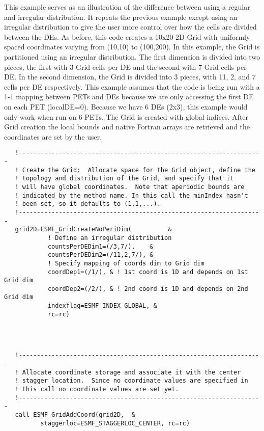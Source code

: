    This example serves as an illustration of the difference between using
   a regular and irregular distribution. It repeats the previous example
   except using an irregular distribution to give the user more control
   over how the cells are divided between the DEs. As before, this code
   creates a 10x20 2D Grid with uniformly spaced coordinates  varying from (10,10) to (100,200).
   In this example, the Grid is partitioned using an irregular distribution. The first dimension
   is divided into two pieces, the first with 3 Grid cells per
   DE and the second with 7 Grid cells per DE. In the second dimension,
   the Grid is divided into 3 pieces, with 11, 2, and 7 cells per DE respectively.
   This example assumes that the code is being run with a 1-1 mapping between
   PETs and DEs because we are only accessing the first DE on each PET (localDE=0).
   Because we have 6 DEs (2x3), this example would only work when run on 6 PETs.
   The Grid is created with global indices. After Grid creation the
   local bounds and native Fortran arrays are retrieved and the
   coordinates are set by the user.
   

 \begin{verbatim}
   !-------------------------------------------------------------------
   ! Create the Grid:  Allocate space for the Grid object, define the
   ! topology and distribution of the Grid, and specify that it
   ! will have global coordinates.  Note that aperiodic bounds are
   ! indicated by the method name. In this call the minIndex hasn't
   ! been set, so it defaults to (1,1,...).
   !-------------------------------------------------------------------
   grid2D=ESMF_GridCreateNoPeriDim(          &
            ! Define an irregular distribution
            countsPerDEDim1=(/3,7/),    &
            countsPerDEDim2=(/11,2,7/), &
            ! Specify mapping of coords dim to Grid dim
            coordDep1=(/1/), & ! 1st coord is 1D and depends on 1st Grid dim
            coordDep2=(/2/), & ! 2nd coord is 1D and depends on 2nd Grid dim
            indexflag=ESMF_INDEX_GLOBAL, &
            rc=rc)
 
\end{verbatim}
 

 \begin{verbatim}


   !-------------------------------------------------------------------
   ! Allocate coordinate storage and associate it with the center
   ! stagger location.  Since no coordinate values are specified in
   ! this call no coordinate values are set yet.
   !-------------------------------------------------------------------
   call ESMF_GridAddCoord(grid2D,  &
          staggerloc=ESMF_STAGGERLOC_CENTER, rc=rc)
 
\end{verbatim}
 
